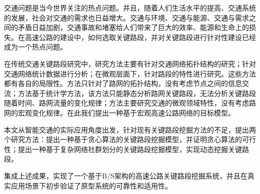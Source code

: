 
\begin{cabstract}

		交通问题是当今世界关注的热点问题。并且，随着人们生活水平的提高、交通系统的发展，社会对交通的需求也日益增大。交通与环境、交通与能源、交通与需求之间的矛盾日益加剧，交通事故和堵塞给人们带来了巨大的效率、能源和生命上的损失。在高速公路的建设中，如何选取关键路段，并对关键路段进行针对性建设已经成为一个热点问题。

		在传统交通关键路段研究中，研究方法主要有针对交通网络拓扑结构的研究；针对交通网络统计数据进行分析；在微观层面下，针对路段的特性进行研究。这些方法都有各自的局限性。方法只针对了路网的拓扑结构，没有考虑节点之间的信息交流；方法基于统计学方法，该方法只能静态分析路网关键路段，无法分析关键路段随着时间、路网流量的变化规律；方法主要研究交通的微观领域特性，没有考虑路网的宏观变化规律。在此我们提出一种基于宏观高速公路网络的目标模型。

		本文从智能交通的实际应用角度出发，针对现有关键路段挖掘方法的不足，提出两个研究方法：提出一种基于贪心算法的关键路段挖掘模型，并证明贪心算法的可行性；提出一种基于复杂网络社群划分的关键路段挖掘模型，实现动态挖掘关键路段。

		集成上述成果，实现了一个基于B/S架构的高速公路关键路段挖掘系统，并且在真实应用场景下初步验证了原型系统的可靠性和适用性。
\end{cabstract}

